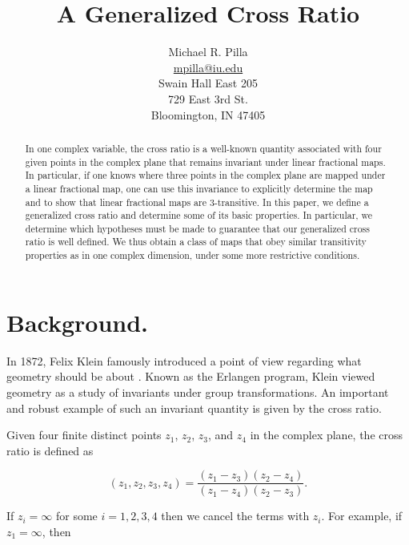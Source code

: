 \documentclass{amsart}
\theoremstyle{theorem}
\theoremstyle{lemma}
\theoremstyle{definition}
\begin{document}
\title{A Generalized Cross Ratio}
\author{Michael R. Pilla \\ \href{mailto:mpilla@iu.edu}{mpilla@iu.edu} \\ Swain Hall East 205 \\ 729 East 3rd St. \\ Bloomington, IN 47405}

\maketitle

\begin{abstract}
In one complex variable, the cross ratio is a well-known quantity associated with four given points in the complex plane that remains invariant under linear fractional maps. In particular, if one knows where three points in the complex plane are mapped under a linear fractional map, one can use this invariance to explicitly determine the map and to show that linear fractional maps are $3$-transitive. In this paper, we define a generalized cross ratio and determine some of its basic properties. In particular, we determine which hypotheses must be made to guarantee that our generalized cross ratio is well defined. We thus obtain a class of maps that obey similar transitivity properties as in one complex dimension, under some more restrictive conditions.
\end{abstract}

\section{Background.}


In 1872, Felix Klein famously introduced a point of view regarding what geometry should be about \cite{Klein}. Known as the Erlangen program, Klein viewed geometry as a study of invariants under group transformations. An important and robust example of such an invariant quantity is given by the cross ratio.

Given four finite distinct points $z_1$, $z_2$, $z_3$, and $z_4$ in the complex plane, the cross ratio is defined as 

\begin{equation}\label{lfm1}
(z_1, z_2 , z_3, z_4)=\frac{(z_1-z_3)(z_2-z_4)}{(z_1-z_4)(z_2-z_3)}.
\end{equation}

If $z_i=\infty$ for some $i=1,2,3,4$ then we cancel the terms with $z_i$. For example, if $z_1=\infty$, then 
\end{document}
